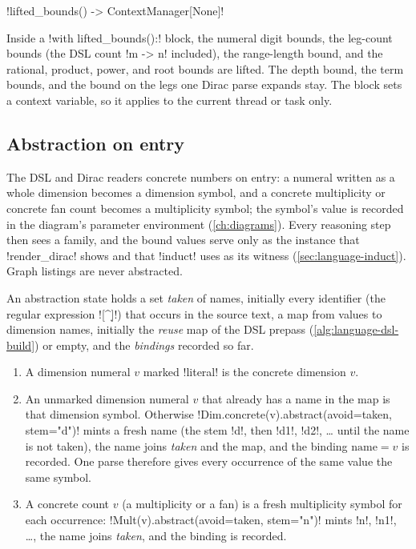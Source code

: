 \begin{signature}
\py!lifted_bounds() -> ContextManager[None]!
\end{signature}
Inside a \py!with lifted_bounds():! block, the numeral digit bounds, the leg-count bounds (the DSL count \code!m -> n! included), the range-length bound, and the rational, product, power, and root bounds are lifted. The depth bound, the term bounds, and the bound on the legs one Dirac parse expands stay. The block sets a context variable, so it applies to the current thread or task only.

\subsection{Abstraction on entry}\label{sec:language-abstraction}

The DSL and Dirac readers  concrete numbers on entry: a numeral written as a whole dimension becomes a dimension symbol, and a concrete \bbox{} multiplicity or concrete fan count becomes a multiplicity symbol; the symbol's value is recorded in the diagram's parameter environment (\cref{ch:diagrams}). Every reasoning step then sees a family, and the bound values serve only as the instance that \py!render_dirac! shows and that \azx!induct! uses as its witness (\cref{sec:language-induct}). Graph listings are never abstracted.

\begin{algorithm}\label{alg:language-abstraction}
\leavevmode
An abstraction state holds a set \emph{taken} of names, initially every identifier (the regular expression \code![^\W\d]\w*!) that occurs in the source text, a map from values to dimension names, initially the \emph{reuse} map of the DSL prepass (\cref{alg:language-dsl-build}) or empty, and the \emph{bindings} recorded so far.
\begin{enumerate}
\item A dimension numeral $v$ marked \code!literal! is the concrete dimension $v$.
\item An unmarked dimension numeral $v$ that already has a name in the map is that dimension symbol. Otherwise \code!Dim.concrete(v).abstract(avoid=taken, stem="d")! mints a fresh name (the stem \code!d!, then \code!d1!, \code!d2!, \ldots{} until the name is not taken), the name joins \emph{taken} and the map, and the binding $\text{name}=v$ is recorded. One parse therefore gives every occurrence of the same value the same symbol.
\item A concrete count $v$ (a \bbox{} multiplicity or a fan) is a fresh multiplicity symbol for each occurrence: \code!Mult(v).abstract(avoid=taken, stem="n")! mints \code!n!, \code!n1!, \ldots, the name joins \emph{taken}, and the binding is recorded.
\end{enumerate}
\end{algorithm}

